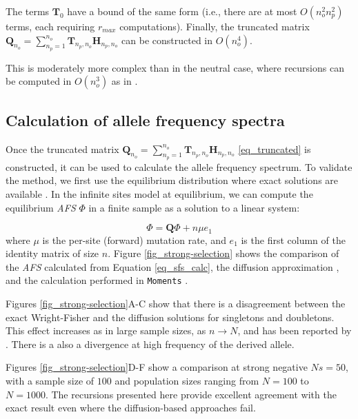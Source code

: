 \documentclass[review]{elsarticle}
\newcommand{\ra}{\rightarrow}
\newcommand{\sgcomment}[1]{{\color{red}{SG: #1}}}
\begin{document}
 
 
 The terms  $\mathbf{T}_{0}$ have a bound of the same form (i.e., there are at most $O(n_o^2 n_p^2)$ terms, each requiring $r_{max}$ computations).  
Finally, the truncated matrix $\mathbf{Q}_{n_o} = \sum_{n_p=1}^{n_{o}} \mathbf{T}_{n_p,n_o} \mathbf{H}_{n_p,n_o}$ can be constructed in $O(n_o^4)$.
\sgcomment{I think some of these $n_o$ might be $n_p$'s}

This is moderately more complex than in the neutral case, where recursions can be computed in $O(n_o^3)$ as in \cite{BhaskarEtAl2014}.

\subsection{Calculation of allele frequency spectra}
\label{subsec_afs}

Once the truncated matrix
$\mathbf{Q}_{n_o} = \sum_{n_p=1}^{n_{o}} \mathbf{T}_{n_p,n_o} \mathbf{H}_{n_p,n_o}$
\eqref{eq_truncated} is constructed, it can be used to calculate the allele frequency spectrum. To
validate the method, we first use the equilibrium distribution where exact solutions are available
\citep{Krukov2016}. In the infinite sites model at equilibrium, we can compute the
equilibrium \textit{AFS} $\Phi$ in a finite sample as a solution to a linear system:

\begin{equation}
  \label{eq_sfs_calc}
  \Phi = \mathbf{Q}\Phi  + n \mu e_1
\end{equation}
where $\mu$ is the per-site (forward) mutation rate, and $e_1$ is the first column of the identity
matrix of size $n$. Figure \ref{fig_strong-selection} shows the comparison of the \textit{AFS}
calculated from Equation \eqref{eq_sfs_calc}, the diffusion approximation
\cite[eq. 9.23]{Ewens2004}, and the calculation performed in \texttt{Moments}
\citep{JouganousEtAl2017}.

Figures \ref{fig_strong-selection}A-C show that there is a disagreement between the exact
Wright-Fisher and the diffusion solutions for singletons and doubletons. This effect increases as in
large sample sizes, as $n \ra N$, and has been reported by \citep{BhaskarEtAl2014}. There is a also
a divergence at high frequency of the derived allele. %

Figures \ref{fig_strong-selection}D-F show a comparison at strong negative $Ns=50$, with a
sample size of $100$ and population sizes ranging from $N=100$ to  $N=1000.$  
The recursions presented here provide excellent agreement with the exact result even 
where the diffusion-based approaches fail. 
\end{document}
